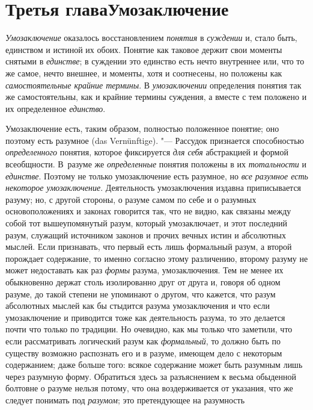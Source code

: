 \chapter[Третья глава Умозаключение]{Третья глава\newline Умозаключение}
{\em Умозаключение}
оказалось восстановлением
{\em понятия} в
{\em суждении} и, стало
быть, единством и истиной их обоих. Понятие как таковое держит свои моменты
снятыми в {\em единстве};
в суждении это единство есть нечто внутреннее или, что то же
самое, нечто внешнее, и моменты, хотя и соотнесены, но положены как
{\em самостоятельные крайние термины}.
В {\em умозаключении}
определения понятия так же самостоятельны, как и крайние
термины суждения, а вместе с тем положено и их определенное
{\em единство}.

Умозаключение есть, таким образом, полностью положенное
понятие; оно поэтому есть разумное (das Vernünftige). "---
Рассудок признается способностью
{\em определенного}
понятия, которое фиксируется
{\em для себя} абстракцией и
формой всеобщности. В~разуме же
{\em определенные}
понятия положены в их
{\em тотальности} и
{\em единстве}. Поэтому
не только умозаключение есть разумное, но
{\em все разумное есть некоторое
умозаключение}. Деятельность умозаключения издавна
приписывается разуму; но, с другой стороны, о разуме самом по себе и о
разумных основоположениях и законах говорится так, что не видно, как
связаны между собой тот вышеупомянутый разум, который умозаключает, и этот
последний разум, служащий источником законов и прочих вечных истин и
абсолютных мыслей. Если признавать, что первый есть лишь формальный разум,
а второй порождает содержание, то именно согласно этому различению, второму
разуму не может недоставать как раз
{\em формы} разума,
умозаключения. Тем не менее их обыкновенно держат столь изолированно друг
от друга и, говоря об одном разуме, до такой степени не упоминают о
другом, что кажется, что разум абсолютных мыслей как бы
стыдится разума умозаключения и что если умозаключение и приводится тоже
как деятельность разума, то это делается почти что только по традиции. Но
очевидно, как мы только что заметили, что если рассматривать логический
разум как {\em формальный},
то должно быть по существу возможно распознать его и в
разуме, имеющем дело с некоторым содержанием; даже больше того: всякое
содержание может быть разумным лишь через разумную форму. Обратиться здесь
за разъяснением к весьма обыденной болтовне о разуме нельзя потому, что она
воздерживается от указания, что же следует понимать под
{\em разумом}; это
претендующее на разумность
